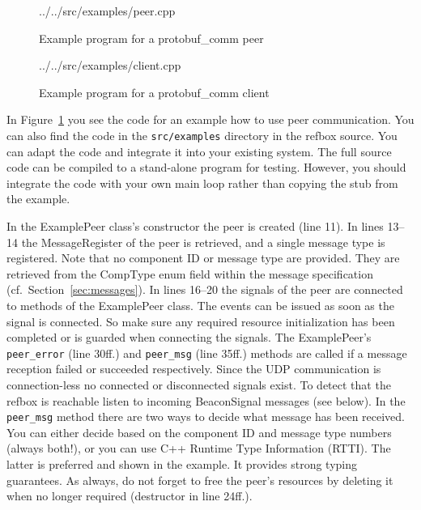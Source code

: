 \documentclass[a4paper]{article}
\newcommand{\refsec}[1]{Section~\ref{#1}}
\newcommand{\reffig}[1]{Figure~\ref{#1}}
\begin{document}
\begin{figure}
  
    {../../src/examples/peer.cpp}
\caption{Example program for a protobuf\_comm peer}
\label{fig:example-peer}
\end{figure}
\begin{figure}
  
    {../../src/examples/client.cpp}
\caption{Example program for a protobuf\_comm client}
\label{fig:example-client}
\end{figure}
In \reffig{fig:example-peer} you see the code for an example how to
use peer communication. You can also find the code in the
\texttt{src/examples} directory in the refbox source. You can adapt
the code and integrate it into your existing system. The full source
code can be compiled to a stand-alone program for testing. However,
you should integrate the code with your own main loop rather than
copying the stub from the example.

In the ExamplePeer class's constructor the peer is created (line
11). In lines 13--14 the MessageRegister of the peer is retrieved, and
a single message type is registered. Note that no component ID or
message type are provided. They are retrieved from the CompType enum
field within the message specification (cf.~\refsec{sec:messages}). In
lines 16--20 the signals of the peer are connected to methods of the
ExamplePeer class. The events can be issued as soon as the signal is
connected. So make sure any required resource initialization has been
completed or is guarded when connecting the signals. The ExamplePeer's
\texttt{peer\_error} (line 30ff.) and \texttt{peer\_msg} (line 35ff.)
methods are called if a message reception failed or succeeded
respectively. Since the UDP communication is connection-less no
connected or disconnected signals exist. To detect that the refbox is
reachable listen to incoming BeaconSignal messages (see below). In the
\texttt{peer\_msg} method there are two ways to decide what message
has been received. You can either decide based on the component ID and
message type numbers (always both!), or you can use C++ Runtime Type
Information (RTTI). The latter is preferred and shown in the
example. It provides strong typing guarantees. As always, do not
forget to free the peer's resources by deleting it when no longer
required (destructor in line 24ff.).
\end{document}
